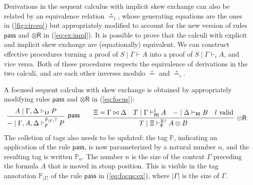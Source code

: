 \documentclass[submission,copyright,creativecommons]{eptcs}
\theoremstyle{definition}
\newcommand{\tr}{\otimes \mathsf{R}}
\newcommand{\pass}{\mathsf{pass}}
\newcommand{\ot}{\otimes}
\newcommand{\RI}{\mathsf{RI}}
\newcommand{\LI}{\mathsf{LI}}
\newcommand{\F}{\mathsf{F}}
\newcommand{\tP}{\mathbb{P}}
\newcommand{\tE}{\mathbb{R}}
\begin{document}
Derivations in the sequent calculus with implicit skew exchange can also be related by an equivalence relation $\circeq_i$, whose generating equations are the ones in (\ref{fig:circeq}) but appropriately modified to account for the new version of rules $\pass$ and $\tr$ in (\ref{eq:ex:impl}).
It is possible to prove that the calculi with explicit and implicit skew exchange are (equationally) equivalent.
We can construct effective procedures turning a proof of $S \mid \Gamma \vdash A$ into a proof of $S \mid \Gamma \vdash_i A$, and vice versa.
Both of these procedures respects the equivalence of derivations in the two calculi, and are each other inverses modulo $\circeq$ and $\circeq_i$.

A focused sequent calculus with skew exchange is obtained by appropriately modifying rules $\pass$ and $\tr$ in (\ref{eq:focus}):
\begin{equation}\label{eq:focus:ex}
    \infer[\pass]{{-} \mid \Gamma,A,\Delta \vdash^{\tP_{|\Gamma|}?}_{\F} P }{
        A \mid \Gamma,\Delta \vdash_{\LI} P
    }
    \qquad
    \infer[\tr]{T \mid \Xi \vdash^{\tE?}_{\F} A \ot B}{
      \Xi = \Gamma \bowtie \Delta
      &
      T \mid \Gamma \vdash^{l}_{\RI} A
      &
      {-} \mid \Delta \vdash_{\RI} B
      &
      l \ \text{valid}
    }
\end{equation}
The colletion of tags also needs to be updated: the tag $\tP$, indicating an application of the rule $\pass$, is now parameterized by a natural number $n$, and the resulting tag is written $\tP_n$. The number $n$ is the size of the context $\Gamma$ preceding the formula $A$ that is moved in stoup position. This is visible in the tag annotation $\tP_{|\Gamma|}$ of the rule $\pass$ in (\ref{eq:focus:ex}), where $|\Gamma|$ is the size of $\Gamma$.
\end{document}
